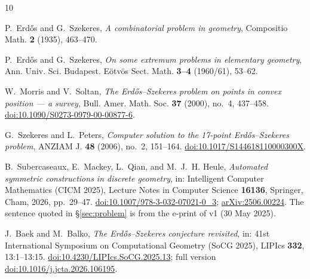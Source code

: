 \documentclass[11pt]{amsart}
\theoremstyle{remark}
\begin{document}
\begin{thebibliography}{10}

P.~Erd\H{o}s and G.~Szekeres,
\emph{A combinatorial problem in geometry},
Compositio Math. \textbf{2} (1935), 463--470.

P.~Erd\H{o}s and G.~Szekeres,
\emph{On some extremum problems in elementary geometry},
Ann. Univ. Sci. Budapest. E\"otv\"os Sect. Math. \textbf{3--4} (1960/61),
53--62.

W.~Morris and V.~Soltan,
\emph{The Erd\H{o}s--Szekeres problem on points in convex position ---
a survey},
Bull. Amer. Math. Soc. \textbf{37} (2000), no.~4, 437--458.
\href{https://doi.org/10.1090/S0273-0979-00-00877-6}%
{doi:10.1090/S0273-0979-00-00877-6}.

G.~Szekeres and L.~Peters,
\emph{Computer solution to the 17-point Erd\H{o}s--Szekeres problem},
ANZIAM J. \textbf{48} (2006), no.~2, 151--164.
\href{https://doi.org/10.1017/S144618110000300X}%
{doi:10.1017/S144618110000300X}.

B.~Subercaseaux, E.~Mackey, L.~Qian, and M.~J.~H. Heule,
\emph{Automated symmetric constructions in discrete geometry},
in: Intelligent Computer Mathematics (CICM 2025), Lecture Notes in Computer
Science \textbf{16136}, Springer, Cham, 2026, pp.~29--47.
\href{https://doi.org/10.1007/978-3-032-07021-0_3}%
{doi:10.1007/978-3-032-07021-0\_3};
\href{https://arxiv.org/abs/2506.00224}{arXiv:2506.00224}.
The sentence quoted in \S\ref{sec:problem} is from the e-print of v1
(30 May 2025).

J.~Baek and M.~Balko,
\emph{The Erd\H{o}s--Szekeres conjecture revisited},
in: 41st International Symposium on Computational Geometry (SoCG 2025),
LIPIcs \textbf{332}, 13:1--13:15.
\href{https://doi.org/10.4230/LIPIcs.SoCG.2025.13}%
{doi:10.4230/LIPIcs.SoCG.2025.13};
full version \href{https://doi.org/10.1016/j.jcta.2026.106195}%
{doi:10.1016/j.jcta.2026.106195}.

\end{thebibliography}
\end{document}
